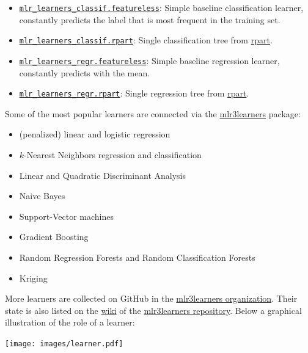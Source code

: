 \documentclass[]{article}
\providecommand{\tightlist}{%
  \setlength{\itemsep}{0pt}\setlength{\parskip}{0pt}}
\begin{document}
\begin{itemize}
\tightlist
\item
  \href{https://mlr3.mlr-org.com/reference/mlr_learners_classif.featureless.html}{\texttt{mlr\_learners\_classif.featureless}}: Simple baseline classification learner, constantly predicts the label that is most frequent in the training set.
\item
  \href{https://mlr3.mlr-org.com/reference/mlr_learners_classif.rpart.html}{\texttt{mlr\_learners\_classif.rpart}}: Single classification tree from \href{https://cran.r-project.org/package=rpart}{rpart}.
\item
  \href{https://mlr3.mlr-org.com/reference/mlr_learners_regr.featureless.html}{\texttt{mlr\_learners\_regr.featureless}}: Simple baseline regression learner, constantly predicts with the mean.
\item
  \href{https://mlr3.mlr-org.com/reference/mlr_learners_regr.rpart.html}{\texttt{mlr\_learners\_regr.rpart}}: Single regression tree from \href{https://cran.r-project.org/package=rpart}{rpart}.
\end{itemize}

Some of the most popular learners are connected via the \href{https://mlr3learners.mlr-org.com}{mlr3learners} package:

\begin{itemize}
\tightlist
\item
  (penalized) linear and logistic regression
\item
  \(k\)-Nearest Neighbors regression and classification
\item
  Linear and Quadratic Discriminant Analysis
\item
  Naive Bayes
\item
  Support-Vector machines
\item
  Gradient Boosting
\item
  Random Regression Forests and Random Classification Forests
\item
  Kriging
\end{itemize}

More learners are collected on GitHub in the \href{https://github.com/mlr3learners/}{mlr3learners organization}.
Their state is also listed on the \href{https://github.com/mlr-org/mlr3learners/wiki}{wiki} of the \href{https://github.com/mlr-org/mlr3learners/}{mlr3learners repository}.
Below a graphical illustration of the role of a learner:

\texttt{[image: images/learner.pdf]}
\end{document}
